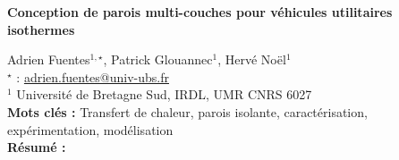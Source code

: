 


    \newpage


%
\begin{flushleft}
\addtocounter{section}{1}
{\Large \textbf{Conception de parois multi-couches pour véhicules utilitaires isothermes}}\label{ref:28}
\end{flushleft}
%
Adrien Fuentes$^{1,\star}$, Patrick Glouannec$^{1}$, Hervé Noël$^{1}$\\[2mm]
$^{\star}$ \Letter : \url{adrien.fuentes@univ-ubs.fr}\\[2mm]
{\footnotesize $^{1}$ Université de Bretagne Sud, IRDL, UMR CNRS 6027}\\
[4mm]
%
\noindent \textbf{Mots clés : } Transfert de chaleur, parois isolante, caractérisation, expérimentation, modélisation\\[4mm]
%
\noindent \textbf{Résumé : } 

